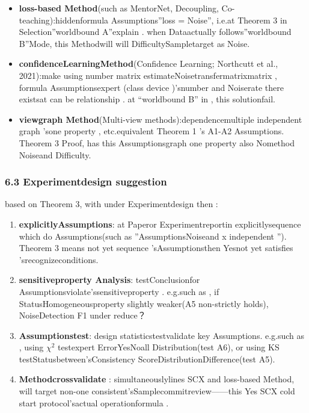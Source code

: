 \documentclass[
  12pt,
]{article}
\begin{document}
\begin{itemize}
\item
  \textbf{loss-based Method}(such as  MentorNet, Decoupling,
  Co-teaching):hiddenformula Assumptions''loss = Noise'', i.e.at  Theorem 3
  in Selection''worldbound  A''explain . when Dataactually follows''worldbound 
  B''Mode, this Methodwill will DifficultySampletarget as Noise. 
\item
  \textbf{confidenceLearningMethod}(Confidence Learning; Northcutt et al.,
  2021):make using number matrix estimateNoisetransfermatrixmatrix , formula Assumptionsexpert (class device )'snumber and Noiserate there existsat can be relationship . at 
  ``worldbound  B'' in , this solutionfail. 
\item
  \textbf{viewgraph Method}(Multi-view
  methods):dependencemultiple independent graph 'sone property , etc.equivalent Theorem 1 's A1-A2
  Assumptions. Theorem 3 Proof, has this Assumptionsgraph one property also Nomethod Noiseand Difficulty. 
\end{itemize}

\subsubsection{6.3
Experimentdesign suggestion}\label{ux5b9eux9a8cux8bbeux8ba1ux5efaux8bae}

based on  Theorem 3, with under Experimentdesign then : 

\begin{enumerate}
\def\labelenumi{\arabic{enumi}.}
\item
  \textbf{explicitlyAssumptions}: at Paperor Experimentreportin explicitlysequence which do Assumptions(such as ''AssumptionsNoiseand 
  x independent ''). Theorem 3 means not yet sequence 'sAssumptionsthen Yesnot yet satisfies 'srecognizeconditions. 
\item
  \textbf{sensitiveproperty Analysis}: testConclusionfor Assumptionsviolate'ssensitiveproperty . e.g.such as , if StatusHomogeneousproperty slightly weaker(A5
  non-strictly holds), NoiseDetection F1 under reduce？
\item
  \textbf{Assumptionstest}: design statisticstestvalidate key Assumptions. e.g.such as , using  \(\chi^2\)
  testexpert ErrorYesNoall Distribution(test A6), or using  KS
  testStatusbetween'sConsistency ScoreDistributionDifference(test A5). 
\item
  \textbf{Methodcrossvalidate }: simultaneouslylines SCX and  loss-based
  Method, will target non-one consistent'sSamplecommitreview------this Yes SCX
  cold start protocol'sactual operationformula . 
\end{enumerate}
\end{document}
